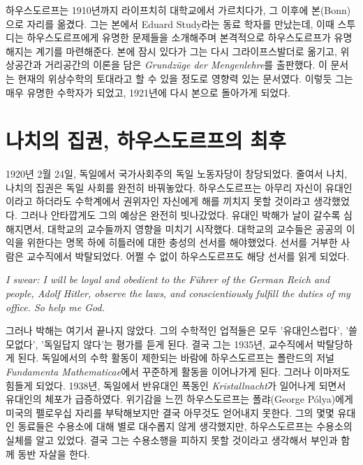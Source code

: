 \documentclass{article}
\begin{document}
    하우스도르프는 1910년까지 라이프치히 대학교에서 가르치다가, 그 이후에 본(Bonn)으로 자리를 옮겼다. 그는 본에서 Eduard Study라는 동료 학자를 만났는데, 이때 스투디는 하우스도르프에게 유명한 문제들을 소개해주며 본격적으로 하우스도르프가 유명해지는 계기를 마련해준다. 본에 잠시 있다가 그는 다시 그라이프스발더로 옮기고, 위상공간과 거리공간의 이론을 담은 \textit{Grundz\"uge der Mengenlehre}를 출판했다. 이 문서는 현재의 위상수학의 토대라고 할 수 있을 정도로 영향력 있는 문서였다. 이렇듯 그는 매우 유명한 수학자가 되었고, 1921년에 다시 본으로 돌아가게 되었다.


    \section*{나치의 집권, 하우스도르프의 최후}


    1920년 2월 24일, 독일에서 국가사회주의 독일 노동자당이 창당되었다. 줄여서 나치, 나치의 집권은 독일 사회를 완전히 바꿔놓았다. 하우스도르프는 아무리 자신이 유대인이라고 하더라도 수학계에서 권위자인 자신에게 해를 끼치지 못할 것이라고 생각했었다. 그러나 안타깝게도 그의 예상은 완전히 빗나갔었다.
 유대인 박해가 날이 갈수록 심해지면서, 대학교의 교수들까지 영향을 미치기 시작했다. 대학교의 교수들은 공공의 이익을 위한다는 명목 하에 히틀러에 대한 충성의 선서를 해야했었다. 선서를 거부한 사람은 교수직에서 박탈되었다. 어쩔 수 없이 하우스도르프도 해당 선서를 읽게 되었다.

    \begin{displayquote}
        \textit{I swear: I will be loyal and obedient to the F\"uhrer of the German Reich and people, Adolf Hitler, observe the laws, and conscientiously fulfill the duties of my office. So help me God.}
    \end{displayquote}

    그러나 박해는 여기서 끝나지 않았다. 그의 수학적인 업적들은 모두 '유대인스럽다', '쓸모없다', '독일답지 않다'는 평가를 듣게 된다. 결국 그는 1935년, 교수직에서 박탈당하게 된다. 독일에서의 수학 활동이 제한되는 바람에 하우스도르프는 폴란드의 저널 \textit{Fundamenta Mathematicae}에서 꾸준하게 활동을 이어나가게 된다. 그러나 이마저도 힘들게 되었다. 1938년, 독일에서 반유대인 폭동인 \textit{Kristallnacht}가 일어나게 되면서 유대인의 체포가 급증하였다. 위기감을 느낀 하우스도르프는 폴랴(George P\'olya)에게 미국의 펠로우십 자리를 부탁해보지만 결국 아무것도 얻어내지 못한다. 그의 몇몇 유대인 동료들은 수용소에 대해 별로 대수롭지 않게 생각했지만, 하우스도르프는 수용소의 실체를 알고 있었다. 결국 그는 수용소행을 피하지 못할 것이라고 생각해서 부인과 함께 동반 자살을 한다.
\end{document}
